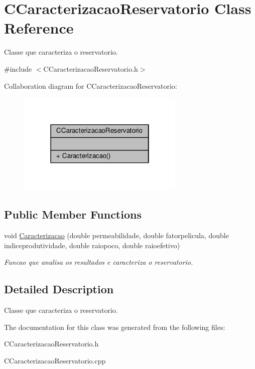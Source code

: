 \hypertarget{classCCaracterizacaoReservatorio}{\section{C\-Caracterizacao\-Reservatorio Class Reference}
\label{classCCaracterizacaoReservatorio}
}


Classe que caracteriza o reservatorio.  




{\ttfamily \#include $<$C\-Caracterizacao\-Reservatorio.\-h$>$}



Collaboration diagram for C\-Caracterizacao\-Reservatorio\-:
\nopagebreak
\begin{figure}[H]
\begin{center}
\leavevmode
\includegraphics[width=226pt]{classCCaracterizacaoReservatorio__coll__graph}
\end{center}
\end{figure}
\subsection*{Public Member Functions}
\begin{DoxyCompactItemize}
\item 
\hypertarget{classCCaracterizacaoReservatorio_af1a321279cc36b716acdf44aab4905da}{void \hyperlink{classCCaracterizacaoReservatorio_af1a321279cc36b716acdf44aab4905da}{Caracterizacao} (double permeabilidade, double fatorpelicula, double indiceprodutividade, double raiopoco, double raioefetivo)}\label{classCCaracterizacaoReservatorio_af1a321279cc36b716acdf44aab4905da}

\begin{DoxyCompactList}\small\item\em Funcao que analisa os resultados e caracteriza o reservatorio. \end{DoxyCompactList}\end{DoxyCompactItemize}


\subsection{Detailed Description}
Classe que caracteriza o reservatorio. 

The documentation for this class was generated from the following files\-:\begin{DoxyCompactItemize}
\item 
C\-Caracterizacao\-Reservatorio.\-h\item 
C\-Caracterizacao\-Reservatorio.\-cpp\end{DoxyCompactItemize}
